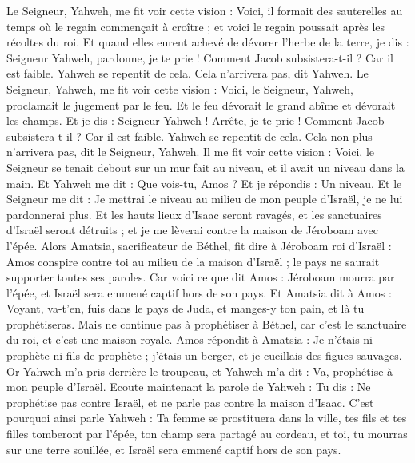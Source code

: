 \begin{multicols}{2}
\VerseOne{}Le Seigneur, Yahweh, me fit voir cette vision : Voici, il formait des sauterelles au temps où le regain commençait à croître ; et voici le regain poussait après les récoltes du roi.
Et quand elles eurent achevé de dévorer l'herbe de la terre, je dis : Seigneur Yahweh, pardonne, je te prie ! Comment Jacob subsistera-t-il ? Car il est faible.
Yahweh se repentit de cela. Cela n'arrivera pas, dit Yahweh.
Le Seigneur, Yahweh, me fit voir cette vision : Voici, le Seigneur, Yahweh, proclamait le jugement par le feu. Et le feu dévorait le grand abîme et dévorait les champs.
Et je dis : Seigneur Yahweh ! Arrête, je te prie ! Comment Jacob subsistera-t-il ? Car il est faible.
Yahweh se repentit de cela. Cela non plus n'arrivera pas, dit le Seigneur, Yahweh.
Il me fit voir cette vision : Voici, le Seigneur se tenait debout sur un mur fait au niveau, et il avait un niveau dans la main.
Et Yahweh me dit : Que vois-tu, Amos ? Et je répondis : Un niveau. Et le Seigneur me dit : Je mettrai le niveau au milieu de mon peuple d'Israël, je ne lui pardonnerai plus.
Et les hauts lieux d'Isaac seront ravagés, et les sanctuaires d'Israël seront détruits ; et je me lèverai contre la maison de Jéroboam avec l'épée.
Alors Amatsia, sacrificateur de Béthel, fit dire à Jéroboam roi d'Israël : Amos conspire contre toi au milieu de la maison d'Israël ; le pays ne saurait supporter toutes ses paroles.
Car voici ce que dit Amos : Jéroboam mourra par l'épée, et Israël sera emmené captif hors de son pays.
Et Amatsia dit à Amos : Voyant, va-t’en, fuis dans le pays de Juda, et manges-y ton pain, et là tu prophétiseras.
Mais ne continue pas à prophétiser à Béthel, car c'est le sanctuaire du roi, et c'est une maison royale.
Amos répondit à Amatsia : Je n'étais ni prophète ni fils de prophète ; j'étais un berger, et je cueillais des figues sauvages.
Or Yahweh m’a pris derrière le troupeau, et Yahweh m’a dit : Va, prophétise à mon peuple d'Israël.
Ecoute maintenant la parole de Yahweh : Tu dis : Ne prophétise pas contre Israël, et ne parle pas contre la maison d'Isaac.
C'est pourquoi ainsi parle Yahweh : Ta femme se prostituera dans la ville, tes fils et tes filles tomberont par l'épée, ton champ sera partagé au cordeau, et toi, tu mourras sur une terre souillée, et Israël sera emmené captif hors de son pays.

\end{multicols}
